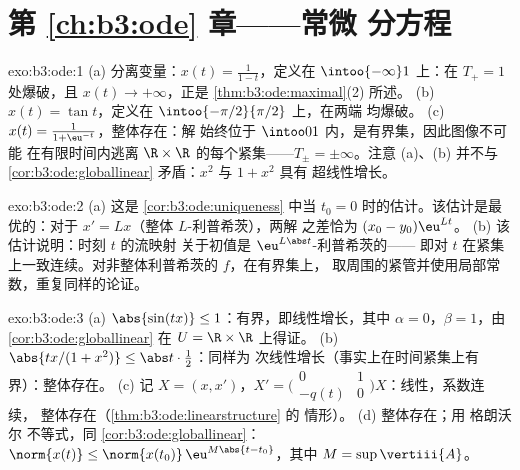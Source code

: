 \section*{第 \ref{ch:b3:ode} 章——常微
分方程}

\begin{solution}{exo:b3:ode:1}
(a) 分离变量：$x(t) = \frac1{1 - t}$，定义在
$\intoo{-\infty}1$ 上：在 $T_+ = 1$ 处爆破，且 $x(t) \to
+\infty$，正是 \cref{thm:b3:ode:maximal}(2) 所述。
(b) $x(t) = \tan t$，定义在 $\intoo{-\pi/2}{\pi/2}$ 上，在两端
均爆破。
(c) $x(t) = \frac{1}{1 + \eu^{-t}}$，整体存在：解
始终位于 $\intoo01$ 内，是有界集，因此图像不可能
在有限时间内逃离 $\R\times\R$ 的每个紧集——$T_\pm
= \pm\infty$。注意 (a)、(b) 并不与
\cref{cor:b3:ode:globallinear} 矛盾：$x^2$ 与 $1 + x^2$ 具有
超线性增长。
\end{solution}

\begin{solution}{exo:b3:ode:2}
(a) 这是 \cref{cor:b3:ode:uniqueness} 中当 $t_0
= 0$ 时的估计。该估计是最优的：对于 $x' = Lx$（整体 $L$-利普希茨），两解
之差恰为 $(x_0 - y_0)\eu^{Lt}$。
(b) 该估计说明：时刻 $t$ 的流映射
关于初值是 $\eu^{L\abs t}$-利普希茨的——
即对 $t$ 在紧集上一致连续。对非整体利普希茨的
$f$，在有界集上，
取周围的紧管并使用局部常数，重复同样的论证。
\end{solution}

\begin{solution}{exo:b3:ode:3}
(a) $\abs{\sin(tx)} \leq 1$：有界，即线性增长，其中
$\alpha = 0$，$\beta = 1$，由 \cref{cor:b3:ode:globallinear} 在
$U = \R\times\R$ 上得证。
(b) $\abs{tx/(1 + x^2)} \leq \abs t\cdot\frac12$：同样为
次线性增长（事实上在时间紧集上有界）：整体存在。
(c) 记 $X = (x, x')$，$X' = \bigl(\begin{smallmatrix}0 & 1\\ -q(t)
& 0\end{smallmatrix}\bigr)X$：线性，系数连续，
整体存在（\cref{thm:b3:ode:linearstructure} 的
情形）。
(d) 整体存在；用 格朗沃尔 不等式，同 \cref{cor:b3:ode:globallinear}：
$\norm{x(t)} \leq \norm{x(t_0)}\,\eu^{M\abs{t - t_0}}$，其中
$M = \sup\vertiii{A}$。
\end{solution}

